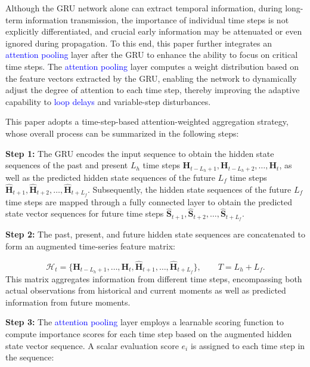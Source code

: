 \documentclass[review]{elsarticle}
\begin{document}
Although the GRU network alone can extract temporal information, during long-term information transmission, the importance of individual time steps is not explicitly differentiated, and crucial early information may be attenuated or even ignored during propagation.
To this end, this paper further integrates an \textcolor{blue}{attention pooling} layer after the GRU to enhance the ability to focus on critical time steps.
The \textcolor{blue}{attention pooling} layer computes a weight distribution based on the feature vectors extracted by the GRU, enabling the network to dynamically adjust the degree of attention to each time step, thereby improving the adaptive capability to \textcolor{blue}{loop delays} and variable-step disturbances.

This paper adopts a time-step-based attention-weighted aggregation strategy, whose overall process can be summarized in the following steps:

\textbf{Step 1:} The GRU encodes the input sequence to obtain the hidden state sequences of the past and present $L_h$ time steps $\mathbf{H}_{t-L_h+1}, \mathbf{H}_{t-L_h+2}, \dots, \mathbf{H}_t$, as well as the predicted hidden state sequences of the future $L_f$ time steps $\hat{\mathbf{H}}_{t+1}, \hat{\mathbf{H}}_{t+2}, \dots, \hat{\mathbf{H}}_{t+L_f}$. Subsequently, the hidden state sequences of the future $L_f$ time steps are mapped through a fully connected layer to obtain the predicted state vector sequences for future time steps $\hat{\mathbf{S}}_{t+1}, \hat{\mathbf{S}}_{t+2}, \dots, \hat{\mathbf{S}}_{t+L_f}$.

\textbf{Step 2:} The past, present, and future hidden state sequences are concatenated to form an augmented time-series feature matrix:

\begin{equation}\label{eq:augmented_feature}
{\mathcal{H}}_{t}=\{{\mathbf{H}}_{t-{L}_{h}+1},\ldots ,{\mathbf{H}}_{t},{\widehat{\mathbf{H}}}_{t+1},\ldots ,{\widehat{\mathbf{H}}}_{t+{L}_{f}}\},\qquad T={L}_{h}+{L}_{f}.
\end{equation}
This matrix aggregates information from different time steps, encompassing both actual observations from historical and current moments as well as predicted information from future moments.

\textbf{Step 3:} The \textcolor{blue}{attention pooling} layer employs a learnable scoring function to compute importance scores for each time step based on the augmented hidden state vector sequence. A scalar evaluation score $e_i$ is assigned to each time step in the sequence:
\end{document}
